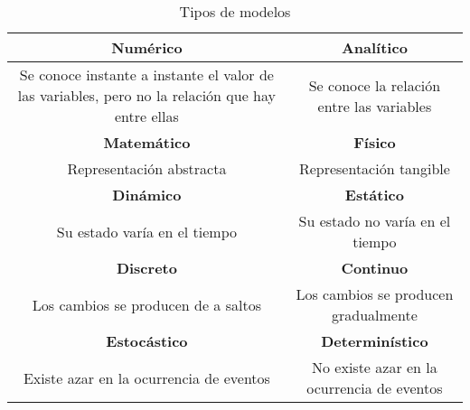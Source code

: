 \documentclass[12pt,a4paper, twoside]{paquetes-apunte/apunte}
\providecommand{\tabularnewline}{\\}
\begin{document}
\noindent \begin{center}
\begin{table}[H]
\noindent \begin{centering}
\begin{tabular}{|c|c|}
\hline 
\textbf{Numérico} & \textbf{Analítico}\tabularnewline
\hline 
\hline 
Se conoce instante a instante el valor de las variables, pero no la
relación que hay entre ellas & Se conoce la relación entre las variables\tabularnewline
\hline 
\textbf{Matemático} & \textbf{Físico}\tabularnewline
\hline 
\hline 
Representación abstracta & Representación tangible\tabularnewline
\hline 
\textbf{Dinámico} & \textbf{Estático}\tabularnewline
\hline 
\hline 
Su estado varía en el tiempo & Su estado no varía en el tiempo\tabularnewline
\hline 
\textbf{Discreto} & \textbf{Continuo}\tabularnewline
\hline 
\hline 
Los cambios se producen de a saltos & Los cambios se producen gradualmente\tabularnewline
\hline 
\textbf{Estocástico} & \textbf{Determinístico}\tabularnewline
\hline 
\hline 
Existe azar en la ocurrencia de eventos & No existe azar en la ocurrencia de eventos\tabularnewline
\hline 
\end{tabular}
\par\end{centering}

\caption{Tipos de modelos}
\end{table}

\par\end{center}
\end{document}
